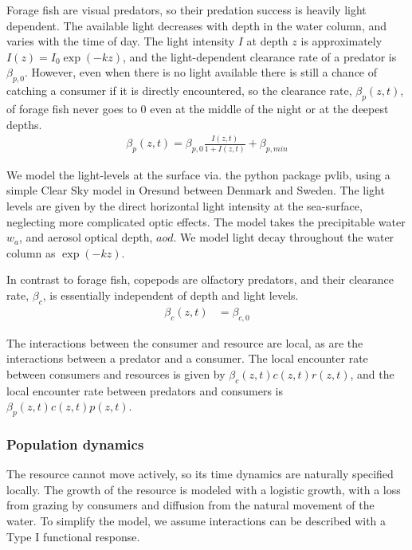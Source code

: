Forage fish are visual predators, so their predation success is heavily light dependent. The available light decreases with depth in the water column, and varies with the time of day.
The light intensity $I$ at depth $z$ is approximately $I(z) = I_0\exp(-kz)$, and the light-dependent clearance rate of a predator is $\beta_{p,0}$.  However, even when there is no light available there is still a chance of catching a consumer if it is directly encountered,  so the clearance rate, $\beta_p(z,t)$, of forage fish never goes to 0 even at the middle of the night or at the deepest depths.
\begin{align*}
  \beta_p(z,t) = \beta_{p,0} \frac{I(z,t)}{1+I(z,t)} + \beta_{p,min}
\end{align*}


We model the light-levels at the surface via. the python package pvlib, using a simple Clear Sky model in Oresund between Denmark and Sweden. The light levels are given by the direct horizontal light intensity at the sea-surface, neglecting more complicated optic effects. The model takes the precipitable water $w_a$, and aerosol optical depth, $aod$. We model light decay throughout the water column as $\exp(-kz)$.


In contrast to forage fish, copepods are olfactory predators, and their clearance rate, $\beta_c$, is essentially independent of depth and light levels.
\begin{align*}
	\beta_c(z,t) &=  \beta_{c,0}
\end{align*}

The interactions between the consumer and resource are local, as are the interactions between a predator and a consumer. The local encounter rate between consumers and resources is given by $\beta_c(z,t)c(z,t)r(z,t)$, and the local encounter rate between predators and consumers is $\beta_p(z,t)c(z,t)p(z,t)$.

\subsubsection*{Population dynamics}

The resource cannot move actively, so its time dynamics are naturally specified locally. The growth of the resource is modeled with a logistic growth, with a loss from grazing by consumers and diffusion from the natural movement of the water. To simplify the model, we assume interactions can be described with a Type I functional response. %


